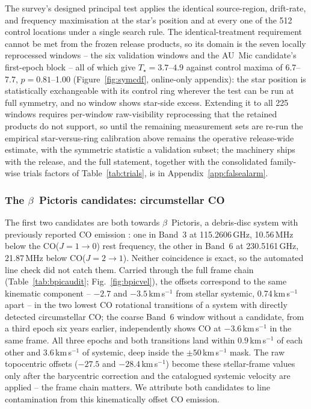 \documentclass{openjournal}
\begin{document}
The survey's designed principal test applies the identical
source-region, drift-rate, and frequency maximisation at the star's
position and at every one of the 512 control locations under a single
search rule. The identical-treatment requirement cannot be met from
the frozen release products, so its domain is the seven locally
reprocessed windows -- the six validation windows and the AU~Mic
candidate's first-epoch block -- all of which give $T_\star=3.7$--$4.9$
against control maxima of 6.7--7.7, $p=0.81$--1.00
(Figure~\ref{fig:symcdf}, online-only appendix): the star position is
statistically exchangeable with its control ring wherever the test
can be run at full symmetry, and no window shows star-side excess.
Extending it to all 225 windows requires per-window raw-visibility
reprocessing that the retained products do not support, so until the
remaining measurement sets are re-run the empirical
star-versus-ring calibration above remains the operative release-wide
estimate, with the symmetric statistic a validation subset; the machinery ships with the release,
and the full statement, together with the consolidated family-wise
trials factors of Table~\ref{tab:trials}, is in
Appendix~\ref{app:falsealarm}.

\subsubsection*{The $\beta$~Pictoris candidates: circumstellar CO}

The first two candidates are both towards $\beta$~Pictoris, a
debris-disc system with previously reported CO emission
\citep{Matra2017}: one in Band~3 at 115.2606\,GHz, 10.56\,MHz below
the CO($J{=}1{\to}0$) rest frequency, the other in Band~6 at
230.5161\,GHz, 21.87\,MHz below CO($J{=}2{\to}1$). Neither
coincidence is exact, so the automated line check did not catch them.
Carried through the full frame chain (Table~\ref{tab:bpicaudit};
Fig.~\ref{fig:bpicvel}), the offsets correspond to the same kinematic
component -- $-2.7$ and $-3.5$\,km\,s$^{-1}$ from stellar systemic,
0.74\,km\,s$^{-1}$ apart -- in the two lowest CO rotational
transitions of a system with directly detected circumstellar CO; the
coarse Band~6 window without a candidate, from a third epoch six
years earlier, independently shows CO at $-3.6$\,km\,s$^{-1}$ in the
same frame. All three epochs and both transitions land within
$0.9$\,km\,s$^{-1}$ of each other and $3.6$\,km\,s$^{-1}$ of
systemic, deep inside the $\pm50$\,km\,s$^{-1}$ mask. The raw
topocentric offsets ($-27.5$ and $-28.4$\,km\,s$^{-1}$) become these
stellar-frame values only after the barycentric correction and the
catalogued systemic velocity are applied -- the frame chain matters.
We attribute both candidates to line contamination from this
kinematically offset CO emission.
\end{document}
